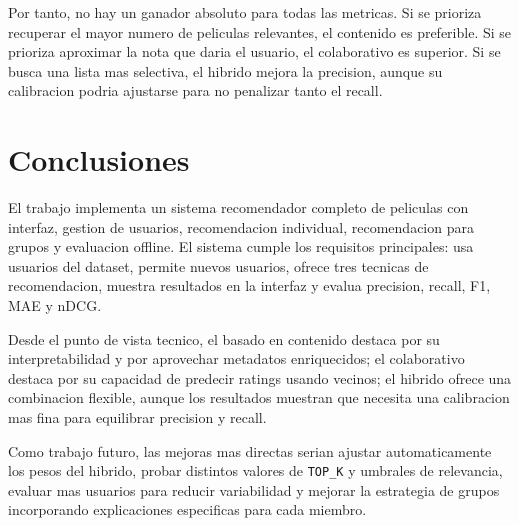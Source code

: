 \documentclass[12pt,a4paper]{article}
\begin{document}
Por tanto, no hay un ganador absoluto para todas las metricas. Si se prioriza recuperar el mayor numero de peliculas relevantes, el contenido es preferible. Si se prioriza aproximar la nota que daria el usuario, el colaborativo es superior. Si se busca una lista mas selectiva, el hibrido mejora la precision, aunque su calibracion podria ajustarse para no penalizar tanto el recall.

\section{Conclusiones}

El trabajo implementa un sistema recomendador completo de peliculas con interfaz, gestion de usuarios, recomendacion individual, recomendacion para grupos y evaluacion offline. El sistema cumple los requisitos principales: usa usuarios del dataset, permite nuevos usuarios, ofrece tres tecnicas de recomendacion, muestra resultados en la interfaz y evalua precision, recall, F1, MAE y nDCG.

Desde el punto de vista tecnico, el basado en contenido destaca por su interpretabilidad y por aprovechar metadatos enriquecidos; el colaborativo destaca por su capacidad de predecir ratings usando vecinos; el hibrido ofrece una combinacion flexible, aunque los resultados muestran que necesita una calibracion mas fina para equilibrar precision y recall.

Como trabajo futuro, las mejoras mas directas serian ajustar automaticamente los pesos del hibrido, probar distintos valores de \texttt{TOP\_K} y umbrales de relevancia, evaluar mas usuarios para reducir variabilidad y mejorar la estrategia de grupos incorporando explicaciones especificas para cada miembro.
\end{document}

